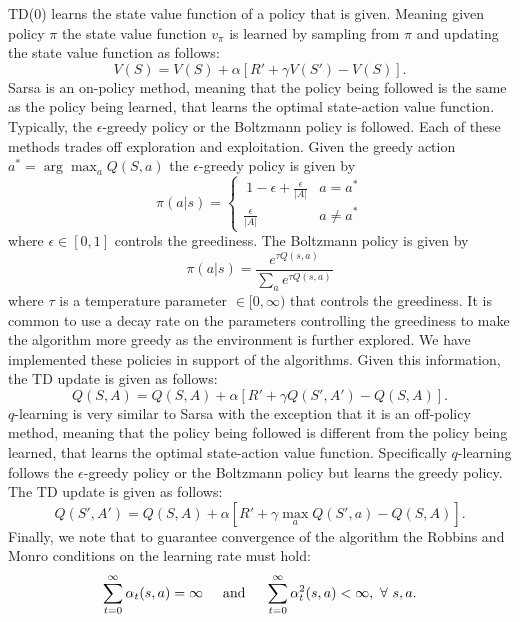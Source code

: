 \documentclass{article}
\begin{document}
TD(0) learns the state value function of a policy that is given. Meaning given policy $\pi$ the state value function $v_\pi$ is learned by sampling from $\pi$ and updating the state value function as follows:
\begin{equation}
V(S) = V(S) + \alpha [R' + \gamma V(S') - V(S)].
\end{equation}
Sarsa is an on-policy method, meaning that the policy being followed is the same as the policy being learned, that learns the optimal state-action value function. Typically, the $\epsilon$-greedy policy or the Boltzmann policy is followed. Each of these methods trades off exploration and exploitation. Given the greedy action $a^* = \arg \max_a Q(S, a)$ the $\epsilon$-greedy policy is given by
\begin{equation} \pi(a|s) =
\begin{cases}
\ 1 - \epsilon + \frac{\epsilon}{|A|} & a = a^* \\
\frac{\epsilon}{|A|} & a \neq a^*
\end{cases}
\end{equation}
where $\epsilon \in [0, 1]$ controls the greediness. The Boltzmann policy is given by
\begin{equation} \pi(a|s) =
\frac{e^{\tau Q(s, a)}}{\sum_a e^{\tau Q(s, a)}} 
\end{equation}
where $\tau$ is a temperature parameter $\in [0, \infty)$ that controls the greediness. It is common to use a decay rate on the parameters controlling the greediness to make the algorithm more greedy as the environment is further explored. We have implemented these policies in support of the algorithms. Given this information, the TD update is given as follows:
\begin{equation}
Q(S, A) = Q(S, A) + \alpha [R' + \gamma Q(S', A') - Q(S, A)].
\end{equation}
$q$-learning is very similar to Sarsa with the exception that it is an off-policy method, meaning that the policy being followed is different from the policy being learned, that learns the optimal state-action value function. Specifically $q$-learning follows the $\epsilon$-greedy policy or the Boltzmann policy but learns the greedy policy. The TD update is given as follows:
\begin{equation}
Q(S', A') = Q(S, A) + \alpha [R' + \gamma \max_a Q(S', a) - Q(S, A)].
\end{equation}
Finally, we note that to guarantee convergence of the algorithm the Robbins and Monro conditions \cite{robbins1951stochastic} on the learning rate must hold:
\begin{equation}
\sum_{t=0}^\infty \alpha_t(s, a) = \infty \hspace{5mm} \text{and} \hspace{5mm} \sum_{t=0}^\infty \alpha_t^2(s, a) < \infty, \ \forall \ s, a.
\end{equation}
 
\end{document}
